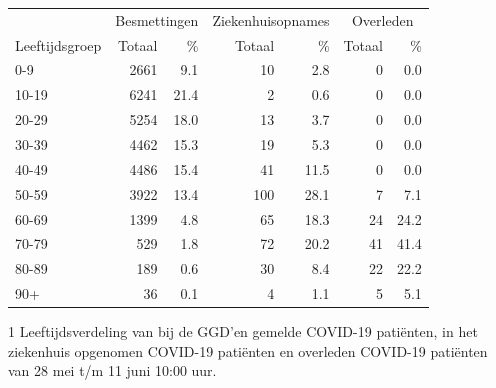\documentclass[
  english,
  man,floatsintext]{apa6}
\begin{document}
\begin{table}
\centering\begingroup\fontsize{11}{13}\selectfont

\begin{threeparttable}
\begin{tabular}{lrrrrrr}
\toprule
\multicolumn{1}{c}{ } & \multicolumn{2}{c}{Besmettingen} & \multicolumn{2}{c}{Ziekenhuisopnames} & \multicolumn{2}{c}{Overleden} \\
\cmidrule(l{3pt}r{3pt}){2-3} \cmidrule(l{3pt}r{3pt}){4-5} \cmidrule(l{3pt}r{3pt}){6-7}
Leeftijdsgroep & Totaal & \% & Totaal & \% & Totaal & \%\\
\midrule
0-9 & 2661 & 9.1 & 10 & 2.8 & 0 & 0.0\\
10-19 & 6241 & 21.4 & 2 & 0.6 & 0 & 0.0\\
20-29 & 5254 & 18.0 & 13 & 3.7 & 0 & 0.0\\
30-39 & 4462 & 15.3 & 19 & 5.3 & 0 & 0.0\\
40-49 & 4486 & 15.4 & 41 & 11.5 & 0 & 0.0\\
50-59 & 3922 & 13.4 & 100 & 28.1 & 7 & 7.1\\
60-69 & 1399 & 4.8 & 65 & 18.3 & 24 & 24.2\\
70-79 & 529 & 1.8 & 72 & 20.2 & 41 & 41.4\\
80-89 & 189 & 0.6 & 30 & 8.4 & 22 & 22.2\\
90+ & 36 & 0.1 & 4 & 1.1 & 5 & 5.1\\
\bottomrule
\end{tabular}
\begin{tablenotes}
\item[1] Leeftijdsverdeling van bij de GGD’en gemelde COVID-19 patiënten, in het ziekenhuis opgenomen COVID-19 patiënten en overleden COVID-19 patiënten van 28 mei t/m 11 juni 10:00 uur.
\end{tablenotes}
\end{threeparttable}
\endgroup{}
\end{table}

\newpage
\end{document}
